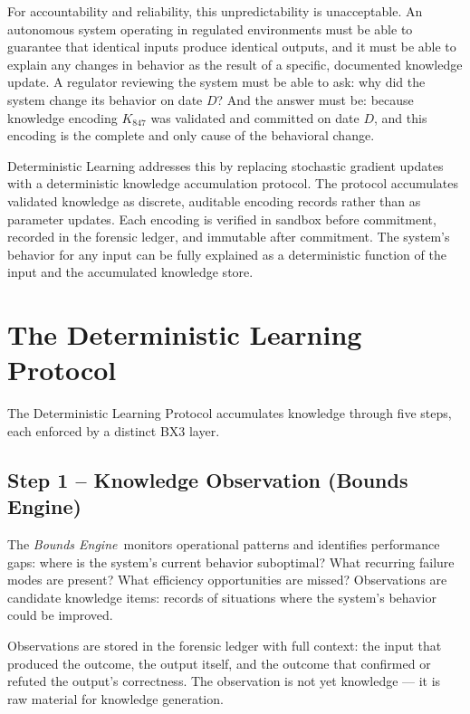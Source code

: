 \documentclass[12pt]{article}
\newcommand{\bounds}{\textit{Bounds Engine}}
\begin{document}
For accountability and reliability, this unpredictability is unacceptable. An autonomous system operating in regulated environments must be able to guarantee that identical inputs produce identical outputs, and it must be able to explain any changes in behavior as the result of a specific, documented knowledge update. A regulator reviewing the system must be able to ask: why did the system change its behavior on date $D$? And the answer must be: because knowledge encoding $K_{847}$ was validated and committed on date $D$, and this encoding is the complete and only cause of the behavioral change.

Deterministic Learning addresses this by replacing stochastic gradient updates with a deterministic knowledge accumulation protocol. The protocol accumulates validated knowledge as discrete, auditable encoding records rather than as parameter updates. Each encoding is verified in sandbox before commitment, recorded in the forensic ledger, and immutable after commitment. The system's behavior for any input can be fully explained as a deterministic function of the input and the accumulated knowledge store.

\section{The Deterministic Learning Protocol}
\label{sec:protocol}

The Deterministic Learning Protocol accumulates knowledge through five steps, each enforced by a distinct BX3 layer.

\subsection{Step 1 -- Knowledge Observation (Bounds Engine)}

The \bounds\ monitors operational patterns and identifies performance gaps: where is the system's current behavior suboptimal? What recurring failure modes are present? What efficiency opportunities are missed? Observations are candidate knowledge items: records of situations where the system's behavior could be improved.

Observations are stored in the forensic ledger with full context: the input that produced the outcome, the output itself, and the outcome that confirmed or refuted the output's correctness. The observation is not yet knowledge --- it is raw material for knowledge generation.
\end{document}
